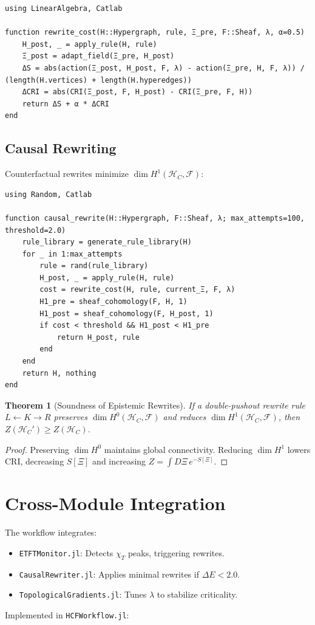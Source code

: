 \documentclass[12pt]{article}
\newtheorem{theorem}{Theorem}[section]
\begin{document}
\begin{verbatim}
using LinearAlgebra, Catlab

function rewrite_cost(H::Hypergraph, rule, Ξ_pre, F::Sheaf, λ, α=0.5)
    H_post, _ = apply_rule(H, rule)
    Ξ_post = adapt_field(Ξ_pre, H_post)
    ΔS = abs(action(Ξ_post, H_post, F, λ) - action(Ξ_pre, H, F, λ)) / (length(H.vertices) + length(H.hyperedges))
    ΔCRI = abs(CRI(Ξ_post, F, H_post) - CRI(Ξ_pre, F, H))
    return ΔS + α * ΔCRI
end
\end{verbatim}

\subsection{Causal Rewriting}
Counterfactual rewrites minimize \(\dim H^1(\mathcal{H}_C, \mathcal{F})\):

\begin{verbatim}
using Random, Catlab

function causal_rewrite(H::Hypergraph, F::Sheaf, λ; max_attempts=100, threshold=2.0)
    rule_library = generate_rule_library(H)
    for _ in 1:max_attempts
        rule = rand(rule_library)
        H_post, _ = apply_rule(H, rule)
        cost = rewrite_cost(H, rule, current_Ξ, F, λ)
        H1_pre = sheaf_cohomology(F, H, 1)
        H1_post = sheaf_cohomology(F, H_post, 1)
        if cost < threshold && H1_post < H1_pre
            return H_post, rule
        end
    end
    return H, nothing
end
\end{verbatim}

\begin{theorem}[Soundness of Epistemic Rewrites]
If a double-pushout rewrite rule \(L \leftarrow K \rightarrow R\) preserves \(\dim H^0(\mathcal{H}_C, \mathcal{F})\) and reduces \(\dim H^1(\mathcal{H}_C, \mathcal{F})\), then \(Z(\mathcal{H}_C') \geq Z(\mathcal{H}_C)\).
\end{theorem}
\begin{proof}
Preserving \(\dim H^0\) maintains global connectivity. Reducing \(\dim H^1\) lowers CRI, decreasing \(S[\Xi]\) and increasing \(Z = \int D\Xi \, e^{-S[\Xi]}\).
\end{proof}

\section{Cross-Module Integration}
The workflow integrates:
\begin{itemize}
    \item \texttt{ETFTMonitor.jl}: Detects \(\chi_T\) peaks, triggering rewrites.
    \item \texttt{CausalRewriter.jl}: Applies minimal rewrites if \(\Delta E < 2.0\).
    \item \texttt{TopologicalGradients.jl}: Tunes \(\lambda\) to stabilize criticality.
\end{itemize}
Implemented in \texttt{HCFWorkflow.jl}:
\end{document}

